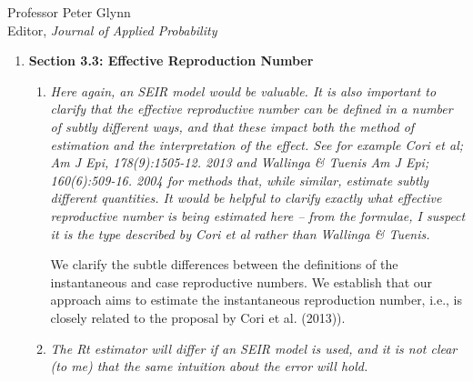\documentclass[11pt]{letter} %
\begin{document}
\begin{letter}{Professor
	Peter Glynn\\
	Editor, {\em Journal of Applied Probability}}
\begin{enumerate}
\begin{enumerate}
	The SIR model in Section 3.2 is replaced by the SEIR model.  We highlight that the SEIR model has been shown to better represent the SARS-CoV-2 dynamics.  Figure 3a presents updated versions of the potnetial bias in ratio estimators under an SEIR model.   The conclusion remains largely the same. The only difference from the prior manuscript is that the peak in bias prior to the ratio going less than 1 is less pronounced (was up to 5, now up to 2).
	\vspace{5mm}
\end{enumerate}
\item {\bf Section 3.3: Effective Reproduction Number}
\begin{enumerate}
	\item {\it Here again, an SEIR model would be valuable. It is also important to clarify that the effective reproductive number can be defined in a number of subtly different ways, and that these impact both the method of estimation and the interpretation of the effect. See for example Cori et al; Am J Epi, 178(9):1505-12. 2013 and Wallinga \& Tuenis Am J Epi; 160(6):509-16. 2004 for methods that, while similar, estimate subtly different quantities. It would be helpful to clarify exactly what effective reproductive number is being estimated here – from the formulae, I suspect it is the type described by Cori et al rather than Wallinga \& Tuenis.}
	\vspace{5mm}

	We clarify the subtle differences between the definitions of the instantaneous and case reproductive numbers.  We establish that our approach aims to estimate the instantaneous reproduction number, i.e., is closely related to the proposal by Cori et al. (2013)).

	\vspace{5mm}
	\item {\it The Rt estimator will differ if an SEIR model is used, and it is not clear (to me) that the same intuition about the error will hold.}
	\vspace{5mm}



\end{enumerate}
\end{enumerate}
\end{letter}
\end{document}
